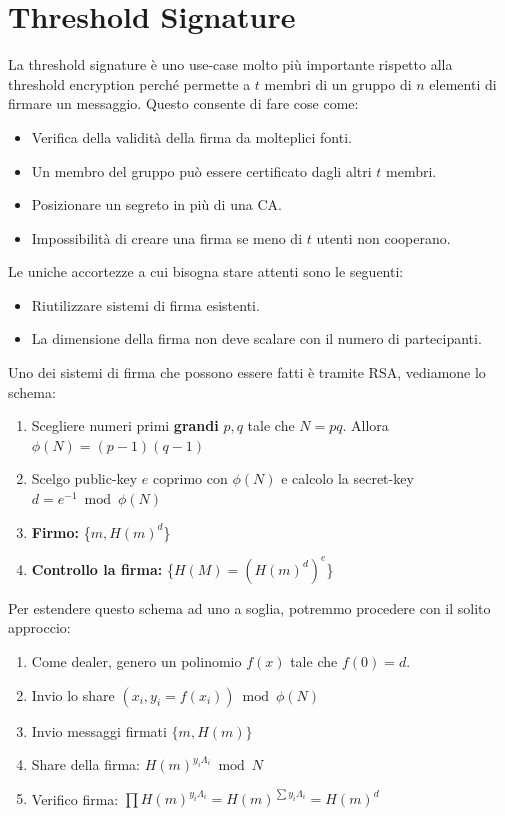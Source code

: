 \section{Threshold Signature}
La threshold signature è uno use-case molto più importante rispetto alla threshold encryption perché permette a $t$ membri di un gruppo di $n$ elementi di firmare un messaggio. Questo consente di fare cose come:
\begin{itemize}
    \item Verifica della validità della firma da molteplici fonti.
    \item Un membro del gruppo può essere certificato dagli altri $t$ membri.
    \item Posizionare un segreto in più di una CA.
    \item Impossibilità di creare una firma se meno di $t$ utenti non cooperano.
\end{itemize}
Le uniche accortezze a cui bisogna stare attenti sono le seguenti: 
\begin{itemize}
    \item Riutilizzare sistemi di firma esistenti.
    \item La dimensione della firma non deve scalare con il numero di partecipanti.
\end{itemize}
Uno dei sistemi di firma che possono essere fatti è tramite RSA, vediamone lo schema:
\begin{definition}\label{def:rsasign}
\begin{enumerate}
    \item Scegliere numeri primi \textbf{grandi} $p,q$ tale che $N=pq$. Allora $\phi(N)=(p-1)(q-1)$
    \item Scelgo public-key $e$ coprimo con $\phi(N)$ e calcolo la secret-key $d=e^{-1}\bmod\phi(N)$
    \item \textbf{Firmo:} \{$m,H(m)^d$\}
    \item \textbf{Controllo la firma:} \{$H(M)=(H(m)^d)^e$\}
\end{enumerate}
\end{definition}
Per estendere questo schema ad uno a soglia, potremmo procedere con il solito approccio:
\begin{enumerate}
    \item Come dealer, genero un polinomio $f(x)$ tale che $f(0)=d$.
    \item Invio lo share $(x_i,y_i=f(x_i))\bmod\phi(N)$
    \item Invio messaggi firmati $\{m, H(m)\}$
    \item Share della firma: $H(m)^{y_i\Lambda_i}\bmod{N}$
    \item Verifico firma: $\prod H(m)^{y_i\Lambda_i}=H(m)^{\sum y_i\Lambda_i}=H(m)^d$
\end{enumerate}
